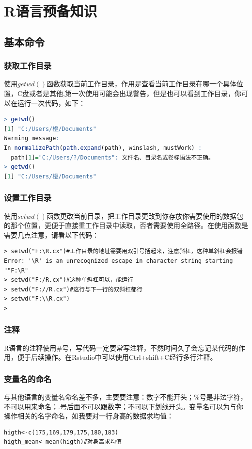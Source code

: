\chapter{R语言预备知识}
\section{基本命令}
\subsection{获取工作目录}
使用$getwd()$函数获取当前工作目录，作用是查看当前工作目录在哪一个具体位置，C盘或者是其他,第一次使用可能会出现警告，但是也可以看到工作目录，你可以在运行一次代码，如下：
\begin{lstlisting}[language=R, basicstyle=\ttfamily\small, backgroundcolor=\color{gray!10}, frame=leftline, xleftmargin=2em]
> getwd()
[1] "C:/Users/橙/Documents"
Warning message:
In normalizePath(path.expand(path), winslash, mustWork) :
  path[1]="C:/Users/?/Documents": 文件名、目录名或卷标语法不正确。
> getwd()
[1] "C:/Users/橙/Documents"
\end{lstlisting}

\subsection{设置工作目录}
使用$setwd()$函数更改当前目录，把工作目录更改到你存放你需要使用的数据包的那个位置，更便于直接重工作目录中读取，否者需要使用全路径。在使用函数是需要几点注意，请看以下代码：
\begin{lstlisting}
> setwd("F:\R.cx")#工作目录的地址需要用双引号括起来，注意斜杠，这种单斜杠会报错
Error: '\R' is an unrecognized escape in character string starting ""F:\R"
> setwd("F:/R.cx")#这种单斜杠可以，能运行
> setwd("F://R.cx")#这行与下一行的双斜杠都行
> setwd("F:\\R.cx")
>
\end{lstlisting}

\subsection{注释}
R语言的注释使用\#号，写代码一定要常写注释，不然时间久了会忘记某代码的作用，便于后续操作。在Rstudio中可以使用Ctrl+shift+C经行多行注释。

\subsection{变量名的命名}
与其他语言的变量名命名差不多，主要要注意：数字不能开头；\%号是非法字符，不可以用来命名；.号后面不可以跟数字；不可以下划线开头。变量名可以为与你操作相关的名字命名，如我要对一行身高的数据求均值：
\begin{lstlisting}
higth<-c(175,169,179,175,180,183)
higth_mean<-mean(higth)#对身高求均值
\end{lstlisting}

